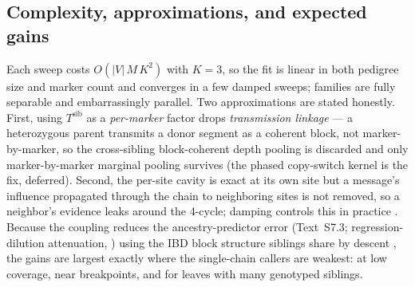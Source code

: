 \documentclass[11pt]{article}
\begin{document}
\subsection{Complexity, approximations, and expected gains}
\label{sec:ped-complexity}

Each sweep costs $O(|V|\,M\,K^2)$ with $K=3$, so the fit is linear in both pedigree
size and marker count and converges in a few damped sweeps; families are fully
separable and embarrassingly parallel. Two approximations are stated honestly. First,
using $T^{\mathrm{sib}}$ as a \emph{per-marker} factor drops \emph{transmission
linkage} --- a heterozygous parent transmits a donor segment as a coherent block, not
marker-by-marker, so the cross-sibling block-coherent depth pooling is discarded and
only marker-by-marker marginal pooling survives (the phased copy-switch kernel is the
fix, deferred). Second, the per-site cavity is exact at its own site but a message's
influence propagated through the chain to neighboring sites is not removed, so a
neighbor's evidence leaks around the 4-cycle; damping controls this in practice
\citep{yedidia_2005}. Because the coupling reduces the ancestry-predictor error
(Text~S7.3; regression-dilution attenuation, \citealp{frost_thompson_2000}) using the
IBD block structure siblings share by descent \citep{fisher_1954,stam_1980}, the
gains are largest exactly where the single-chain callers are weakest: at low
coverage, near breakpoints, and for leaves with many genotyped siblings.



\end{document}
